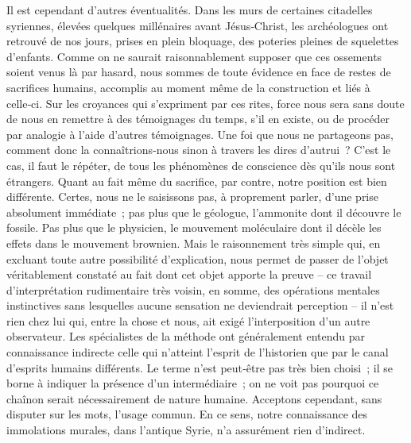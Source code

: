 \documentclass[french,twoside]{book} %
\begin{document}
Il est cependant d’autres éventualités. Dans les murs de certaines citadelles syriennes, élevées quelques millénaires avant Jésus‑Christ, les archéologues ont retrouvé de nos jours, prises en plein bloquage, des poteries pleines de squelettes d’enfants. Comme on ne saurait raisonna­blement supposer que ces ossements soient venus là par hasard, nous sommes de toute évidence en face de restes de sacrifices humains, accomplis au moment même de la construction et liés à celle‑ci. Sur les croyances qui s’expriment par ces rites, force nous sera sans doute de nous en remettre à des témoignages du temps, s’il en existe, ou de procéder par analogie à l’aide d’autres témoignages. Une foi que nous ne partageons pas, com­ment donc la connaîtrions‑nous sinon à travers les dires d’autrui ? C’est le cas, il faut le répéter, de tous les phénomènes de conscience dès qu’ils nous sont étrangers. Quant au fait même du sacrifice, par contre, notre position est bien différente. Certes, nous ne le saisissons pas, à proprement parler, d’une prise absolument immédiate ; pas plus que le géologue, l’ammonite dont il découvre le fossile. Pas plus que le physicien, le mou­vement moléculaire dont il décèle les effets dans le mouvement brownien. Mais le raisonnement très simple qui, en excluant toute autre possibilité d’explication, nous permet de passer de l’objet véritablement constaté au fait dont cet objet apporte la preuve – ce travail d’interprétation rudimentaire très voisin, en somme, des opérations mentales instinctives sans lesquelles aucune sensation ne deviendrait perception – il n’est rien chez lui qui, entre la chose et nous, ait exigé l’interposition d’un  
\label{p20} autre observateur. Les spécialistes de la méthode ont généralement entendu par connaissance indirecte celle qui n’atteint l’esprit de l’historien que par le canal d’esprits humains différents. Le terme n’est peut‑être pas très bien choisi ; il se borne à indiquer la présence d’un intermédiaire ; on ne voit pas pourquoi ce chaînon serait nécessairement de nature humaine. Acceptons cependant, sans disputer sur les mots, l’usage commun. En ce sens, notre connaissance des immolations murales, dans l’antique Syrie, n’a assurément rien d’indirect.\par
\end{document}
